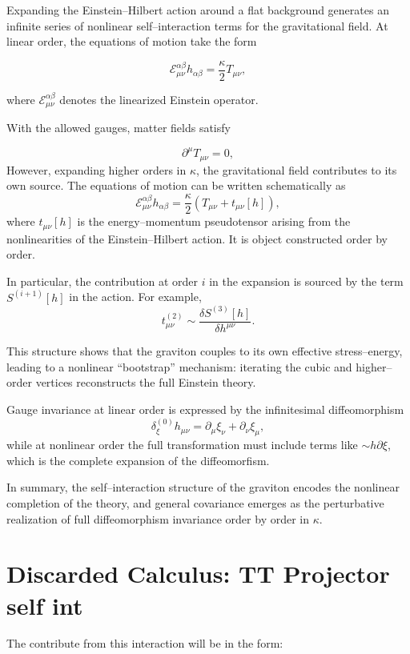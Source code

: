 \documentclass[12pt,a4paper,oneside]{article}
\numberwithin{equation}{section}   %
\begin{document}
Expanding the Einstein–Hilbert action around a flat background generates an infinite 
series of nonlinear self–interaction terms for the gravitational field. At linear order, 
the equations of motion take the form


\[
\mathcal{E}_{\mu\nu}^{\alpha\beta} h_{\alpha\beta}
= \frac{\kappa}{2} T_{\mu\nu},
\]


where \(\mathcal{E}_{\mu\nu}^{\alpha\beta}\) denotes the linearized Einstein operator.

With the allowed gauges, matter fields satisfy


\[
\partial^\mu T_{\mu\nu} = 0,
\]
However, expanding higher orders in \(\kappa\), the gravitational field contributes to its own source. 
The equations of motion can be written schematically as
\begin{equation}
\mathcal{E}_{\mu\nu}^{\alpha\beta} h_{\alpha\beta}
= \frac{\kappa}{2}\left( T_{\mu\nu} + t_{\mu\nu}[h] \right),
\end{equation}
where \(t_{\mu\nu}[h]\) is the energy–momentum pseudotensor arising from the nonlinearities of the Einstein–Hilbert action. 
It is object constructed order by order.

In particular, the contribution at order \(i\) in the expansion is sourced by the term 
\(S^{(i+1)}[h]\) in the action. For example,
\begin{equation}
t_{\mu\nu}^{(2)} \sim \frac{\delta S^{(3)}[h]}{\delta h^{\mu\nu}}.
\end{equation}

This structure shows that the graviton couples to its own effective stress–energy, 
leading to a nonlinear “bootstrap” mechanism: iterating the cubic and higher–order 
vertices reconstructs the full Einstein theory.

Gauge invariance at linear order is expressed by the infinitesimal diffeomorphism
\begin{equation}
\delta_\xi^{(0)} h_{\mu\nu}
= \partial_\mu \xi_\nu + \partial_\nu \xi_\mu,
\end{equation}
while at nonlinear order the full transformation must include terms like $\sim h \partial \xi$, which is the complete expansion of the diffeomorfism.

In summary, the self–interaction structure of the graviton encodes the nonlinear 
completion of the theory, and general covariance emerges as the perturbative 
realization of full diffeomorphism invariance order by order in \(\kappa\).


\section{Discarded Calculus: TT Projector self int}
The contribute from this interaction will be in the form:
\end{document}
